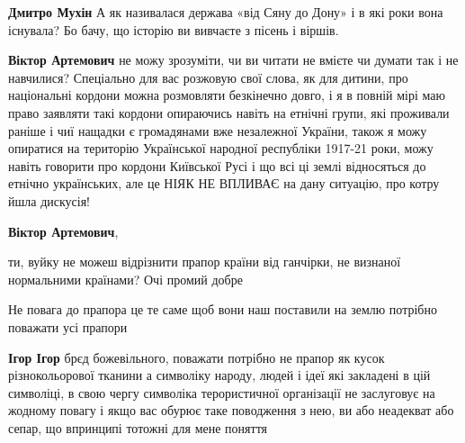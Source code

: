 \begin{itemize}
\begin{itemize}
\begin{itemize}
\textbf{Дмитро Мухін} А як називалася держава «від Сяну до Дону» і в які роки вона існувала? Бо бачу, що історію ви вивчаєте з пісень і віршів.

 
\textbf{Віктор Артемович} не можу зрозуміти, чи ви читати не вмієте чи думати
так і не навчилися? Спеціально для вас розжовую свої слова, як для дитини, про
національні кордони можна розмовляти безкінечно довго, і я в повній мірі маю
право заявляти такі кордони опираючись навіть на етнічні групи, які проживали
раніше і чиї нащадки є громадянами вже незалежної України, також я можу
опиратися на територію Української народної республіки 1917-21 роки, можу
навіть говорити про кордони Київської Русі і що всі ці землі відносяться до
етнічно українських, але це НІЯК НЕ ВПЛИВАЄ на дану ситуацію, про котру йшла
дискусія!

\end{itemize}

 
\textbf{Віктор Артемович}, 

ти, вуйку не можеш відрізнити прапор країни від ганчірки, не визнаної
нормальними країнами? Очі промий добре

\end{itemize}

 
Не повага до прапора це те саме щоб вони наш поставили на землю потрібно
поважати усі прапори

\begin{itemize}
 
\textbf{Ігор Ігор} брєд божевільного, поважати потрібно не прапор як кусок
різнокольорової тканини а символіку народу, людей і ідеї які закладені в цій
символіці, в свою чергу символіка терористичної організації не заслуговує на
жодному повагу і якщо вас обурює таке поводження з нею, ви або неадекват або
сепар, що впринципі тотожні для мене поняття


\end{itemize}
\end{itemize}
